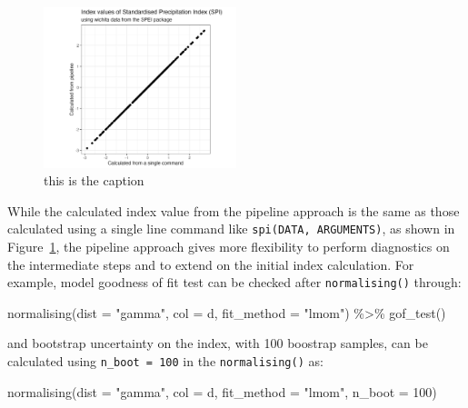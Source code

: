 \documentclass[
]{article}
\newenvironment{Shaded}{\begin{snugshade}}{\end{snugshade}}
\newcommand{\AttributeTok}[1]{\textcolor[rgb]{0.40,0.45,0.13}{#1}}
\newcommand{\DecValTok}[1]{\textcolor[rgb]{0.68,0.00,0.00}{#1}}
\newcommand{\FunctionTok}[1]{\textcolor[rgb]{0.28,0.35,0.67}{#1}}
\newcommand{\NormalTok}[1]{\textcolor[rgb]{0.00,0.23,0.31}{#1}}
\newcommand{\SpecialCharTok}[1]{\textcolor[rgb]{0.37,0.37,0.37}{#1}}
\newcommand{\StringTok}[1]{\textcolor[rgb]{0.13,0.47,0.30}{#1}}
\begin{document}
\begin{figure}

{\centering \includegraphics[width=0.5\textwidth,height=0.5\textheight]{../figures/toy-example-spi.png}

}

\caption{\label{fig-toy-example}this is the caption}

\end{figure}

While the calculated index value from the pipeline approach is the same
as those calculated using a single line command like
\texttt{spi(DATA,\ ARGUMENTS)}, as shown in
Figure~\ref{fig-toy-example}, the pipeline approach gives more
flexibility to perform diagnostics on the intermediate steps and to
extend on the initial index calculation. For example, model goodness of
fit test can be checked after \texttt{normalising()} through:

\begin{Shaded}
\begin{Highlighting}[]
\FunctionTok{normalising}\NormalTok{(}\AttributeTok{dist =} \StringTok{"gamma"}\NormalTok{, }\AttributeTok{col =}\NormalTok{ d, }\AttributeTok{fit\_method =} \StringTok{"lmom"}\NormalTok{) }\SpecialCharTok{\%\textgreater{}\%} 
  \FunctionTok{gof\_test}\NormalTok{()}
\end{Highlighting}
\end{Shaded}

and bootstrap uncertainty on the index, with 100 boostrap samples, can
be calculated using \texttt{n\_boot\ =\ 100} in the
\texttt{normalising()} as:

\begin{Shaded}
\begin{Highlighting}[]
\FunctionTok{normalising}\NormalTok{(}\AttributeTok{dist =} \StringTok{"gamma"}\NormalTok{, }\AttributeTok{col =}\NormalTok{ d, }\AttributeTok{fit\_method =} \StringTok{"lmom"}\NormalTok{, }\AttributeTok{n\_boot =} \DecValTok{100}\NormalTok{) }
\end{Highlighting}
\end{Shaded}
\end{document}
